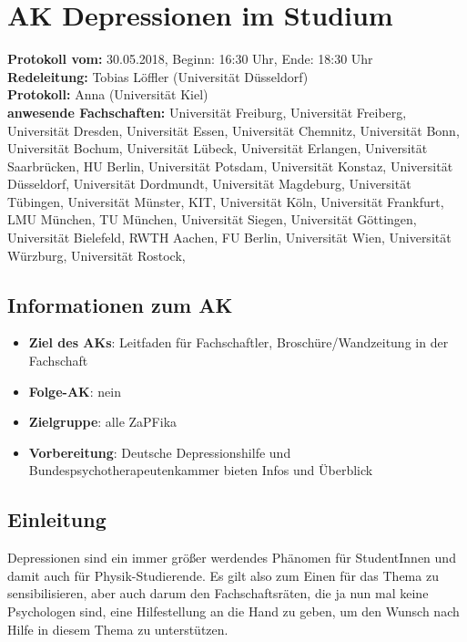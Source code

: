 
\section{AK Depressionen im Studium}

  \textbf{Protokoll vom:} 30.05.2018,
  Beginn: 16:30 Uhr,
  Ende: 18:30 Uhr \\
  \textbf{Redeleitung:} Tobias Löffler (Universität Düsseldorf) \\
  \textbf{Protokoll:} Anna (Universität Kiel) \\
  \textbf{anwesende Fachschaften:} Universität Freiburg, Universität Freiberg, Universität Dresden, Universität Essen, Universität Chemnitz, Universität Bonn, Universität Bochum, Universität Lübeck, Universität Erlangen, Universität Saarbrücken,
  HU Berlin, Universität Potsdam, Universität Konstaz, Universität Düsseldorf, Universität Dordmundt, Universität Magdeburg, Universität Tübingen, Universität Münster,
  KIT, Universität Köln, Universität Frankfurt, LMU München, TU München, Universität Siegen, Universität Göttingen,
  Universität Bielefeld, RWTH Aachen, FU Berlin, Universität Wien, Universität Würzburg, Universität Rostock,

  \subsection*{Informationen zum AK}
    \begin{itemize}
      \item \textbf{Ziel des AKs}: Leitfaden für Fachschaftler, Broschüre/Wandzeitung in der Fachschaft
      \item \textbf{Folge-AK}: nein
      \item \textbf{Zielgruppe}: alle ZaPFika
      \item \textbf{Vorbereitung}: Deutsche Depressionshilfe und Bundespsychotherapeutenkammer bieten Infos und Überblick
    \end{itemize}

  \subsection*{Einleitung}
    Depressionen sind ein immer größer werdendes Phänomen für StudentInnen und damit auch für Physik-Studierende.
    Es gilt also zum Einen für das Thema zu sensibilisieren, aber auch darum den Fachschaftsräten, die ja nun mal keine Psychologen sind,
    eine Hilfestellung an die Hand zu geben, um den Wunsch nach Hilfe in diesem Thema zu unterstützen.

